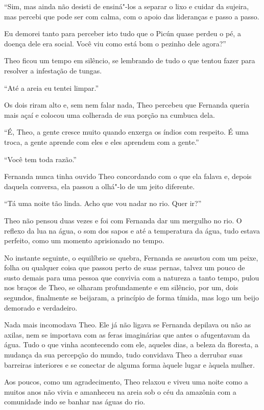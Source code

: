 ``Sim, mas ainda não desisti de ensiná"-los a separar o lixo e cuidar da
sujeira, mas percebi que pode ser com calma, com o apoio das lideranças e
passo a passo.

Eu demorei tanto para perceber isto tudo que o Picún quase perdeu o pé,
a doença dele era social. Você viu como está bom o pezinho dele agora?''

Theo ficou um tempo em silêncio, se lembrando de tudo o que tentou fazer
para resolver a infestação de tungas.

``Até a areia eu tentei limpar.''

Os dois riram alto e, sem nem falar nada, Theo percebeu que Fernanda
queria mais açaí e colocou uma colherada de sua porção na cumbuca dela.

``É, Theo, a gente cresce muito quando enxerga os índios com respeito. É
uma troca, a gente aprende com eles e eles aprendem com a gente.''

``Você tem toda razão.''

Fernanda nunca tinha ouvido Theo concordando com o que ela falava e,
depois daquela conversa, ela passou a olhá"-lo de um jeito diferente.

``Tá uma noite tão linda. Acho que vou nadar no rio. Quer ir?''

Theo não pensou duas vezes e foi com Fernanda dar um mergulho no rio. O
reflexo da lua na água, o som dos sapos e até a temperatura da água,
tudo estava perfeito, como um momento aprisionado no tempo.

No instante seguinte, o equilíbrio se quebra, Fernanda se assustou com
um peixe, folha ou qualquer coisa que passou perto de suas pernas,
talvez um pouco de susto demais para uma pessoa que convivia com a
natureza a tanto tempo, pulou nos braços de Theo, se olharam
profundamente e em silêncio, por um, dois segundos, finalmente se
beijaram, a princípio de forma tímida, mas logo um beijo demorado e
verdadeiro.

Nada mais incomodava Theo. Ele já não ligava se Fernanda depilava ou não
as axilas, nem se importava com as feras imaginárias que antes o
afugentavam da água. Tudo o que vinha acontecendo com ele, aqueles dias,
a beleza da floresta, a mudança da sua percepção do mundo, tudo
convidava Theo a derrubar suas barreiras interiores e se conectar de
alguma forma àquele lugar e àquela mulher.

Aos poucos, como um agradecimento, Theo relaxou e viveu uma noite como a
muitos anos não vivia e amanheceu na areia sob o céu da amazônia com a
comunidade indo se banhar nas águas do rio.

